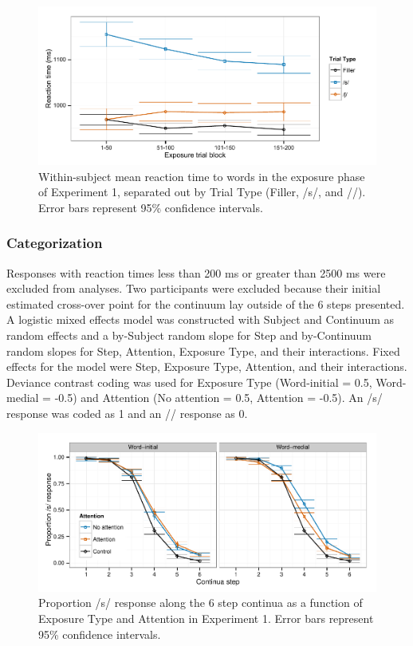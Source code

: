 \begin{figure}[!ht]
\caption{Within-subject mean reaction time to words in the exposure phase of Experiment 1, separated out by Trial Type (Filler, /s/, and /\textesh/). Error bars represent 95\% confidence intervals.}
\label{fig:exp1exposert}
\begin{center}
\includegraphics[width=\textwidth]{graphs/exp1_exprt}
\end{center}
\end{figure}

\subsubsection{Categorization}

Responses with reaction times less than 200 ms or greater than 2500 ms were excluded from analyses. 
Two participants were excluded because their initial estimated cross-over point for the continuum lay outside of the 6 steps presented.  
A logistic mixed effects model was constructed with Subject and Continuum as random effects and a by-Subject random slope for Step and by-Continuum random slopes for Step, Attention, Exposure Type, and their interactions. 
Fixed effects for the model were Step, Exposure Type, Attention, and their interactions.  
Deviance contrast coding was used for Exposure Type (Word-initial = 0.5, Word-medial = -0.5) and Attention (No attention = 0.5, Attention = -0.5).
An /s/ response was coded as 1 and an /\textesh/ response as 0.

\begin{figure}[!ht]
\caption{Proportion /s/ response along the 6 step continua as a function of Exposure Type and Attention in Experiment 1.    Error bars represent 95\% confidence intervals.}
\label{fig:exp1categ}
\begin{center}
\includegraphics[width=\textwidth]{graphs/exp1_categresults}
\end{center}
\end{figure}

